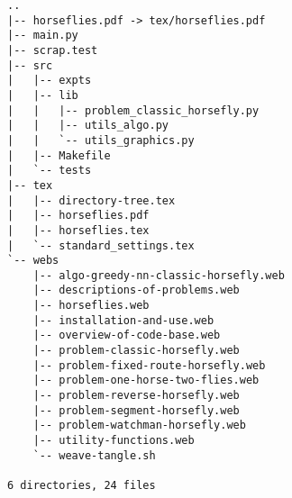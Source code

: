 \begin{verbatim}
..
|-- horseflies.pdf -> tex/horseflies.pdf
|-- main.py
|-- scrap.test
|-- src
|   |-- expts
|   |-- lib
|   |   |-- problem_classic_horsefly.py
|   |   |-- utils_algo.py
|   |   `-- utils_graphics.py
|   |-- Makefile
|   `-- tests
|-- tex
|   |-- directory-tree.tex
|   |-- horseflies.pdf
|   |-- horseflies.tex
|   `-- standard_settings.tex
`-- webs
    |-- algo-greedy-nn-classic-horsefly.web
    |-- descriptions-of-problems.web
    |-- horseflies.web
    |-- installation-and-use.web
    |-- overview-of-code-base.web
    |-- problem-classic-horsefly.web
    |-- problem-fixed-route-horsefly.web
    |-- problem-one-horse-two-flies.web
    |-- problem-reverse-horsefly.web
    |-- problem-segment-horsefly.web
    |-- problem-watchman-horsefly.web
    |-- utility-functions.web
    `-- weave-tangle.sh

6 directories, 24 files
\end{verbatim}
